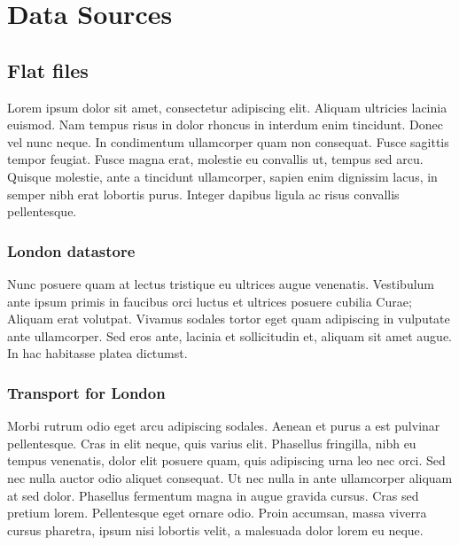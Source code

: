 
\chapter{Data Sources} %

\label{Chapter3} %


\section{Flat files}

Lorem ipsum dolor sit amet, consectetur adipiscing elit. Aliquam ultricies lacinia euismod. Nam tempus risus in dolor rhoncus in interdum enim tincidunt. Donec vel nunc neque. In condimentum ullamcorper quam non consequat. Fusce sagittis tempor feugiat. Fusce magna erat, molestie eu convallis ut, tempus sed arcu. Quisque molestie, ante a tincidunt ullamcorper, sapien enim dignissim lacus, in semper nibh erat lobortis purus. Integer dapibus ligula ac risus convallis pellentesque.

\subsection{London datastore}

Nunc posuere quam at lectus tristique eu ultrices augue venenatis. Vestibulum ante ipsum primis in faucibus orci luctus et ultrices posuere cubilia Curae; Aliquam erat volutpat. Vivamus sodales tortor eget quam adipiscing in vulputate ante ullamcorper. Sed eros ante, lacinia et sollicitudin et, aliquam sit amet augue. In hac habitasse platea dictumst.


\subsection{Transport for London}
Morbi rutrum odio eget arcu adipiscing sodales. Aenean et purus a est pulvinar pellentesque. Cras in elit neque, quis varius elit. Phasellus fringilla, nibh eu tempus venenatis, dolor elit posuere quam, quis adipiscing urna leo nec orci. Sed nec nulla auctor odio aliquet consequat. Ut nec nulla in ante ullamcorper aliquam at sed dolor. Phasellus fermentum magna in augue gravida cursus. Cras sed pretium lorem. Pellentesque eget ornare odio. Proin accumsan, massa viverra cursus pharetra, ipsum nisi lobortis velit, a malesuada dolor lorem eu neque.

